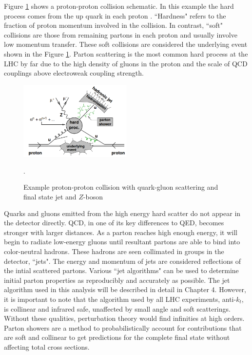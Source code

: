 Figure \ref{fig:protonproton} shows a proton-proton collision schematic. In this example the hard process comes from the up quark in each proton \cite{Butterworth}. ``Hardness" refers to the fraction of proton momentum involved in the collision. In contrast, ``soft" collisions are those from remaining partons in each proton and usually involve low momentum transfer. These soft collisions are considered the underlying event shown in the Figure \ref{fig:protonproton}. Parton scattering is the most common hard process at the LHC by far due to the high density of gluons in the proton and the scale of QCD couplings above electroweak coupling strength. 
\begin{figure}[H]
        \centering
    \includegraphics[width=0.5\textwidth] {Pictures/protonproton.png}\hspace{1cm}
    \caption{Example proton-proton collision with quark-gluon scattering and final state jet and $Z$-boson \cite{Butterworth}}.
    \label{fig:protonproton}
\end{figure}
Quarks and gluons emitted from the high energy hard scatter do not appear in the detector directly. QCD, in one of its key differences to QED, becomes stronger with larger distances. As a parton reaches high enough energy, it will begin to radiate low-energy gluons until resultant partons are able to bind into color-neutral hadrons. These hadrons are seen collimated in groups in the detector, ``jets". The energy and momentum of jets are considered reflections of the intial scattered partons. Various ``jet algorithms" can be used to determine initial parton properties as reproducibly and accurately as possible. The jet algorithm used in this analysis will be described in detail in Chapter 4. However, it is important to note that the algorithm used by all LHC experiments, anti-$k_t$, is collinear and infrared safe, unaffected by small angle and soft scatterings. Without these qualities, perturbation theory would find infinities at high orders. Parton showers are a method to probabilistically account for contributions that are soft and collinear to get predictions for the complete final state without affecting total cross sections. 

